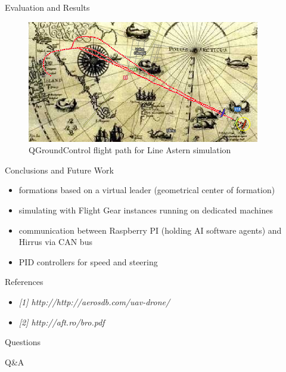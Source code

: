 \documentclass{beamer}
\begin{document}
\begin{frame}{Evaluation and Results}
\begin{center}
\begin{figure}[p]
\includegraphics[width=4in]{img/lineastern.png}
\caption{QGroundControl flight path for Line Astern simulation}
\end{figure}
\end{center}
\end{frame}

\begin{frame}{Conclusions and Future Work}
\begin{itemize}
\item formations based on a virtual leader (geometrical center of formation)
\item simulating with Flight Gear instances running on dedicated machines
\item communication between Raspberry PI (holding AI software agents) and Hirrus via CAN bus
\item PID controllers for speed and steering
\end{itemize}
\end{frame}

\begin{frame}{References}
\begin{itemize}
\item \textit{[1] http://http://aerosdb.com/uav-drone/}
\item \textit{[2] http://aft.ro/bro.pdf}
\end{itemize}
\end{frame}

\begin{frame}{Questions}
\begin{center}
\fontsize{60}{70}\selectfont Q\&A
\end{center}
\end{frame}
\end{document}
